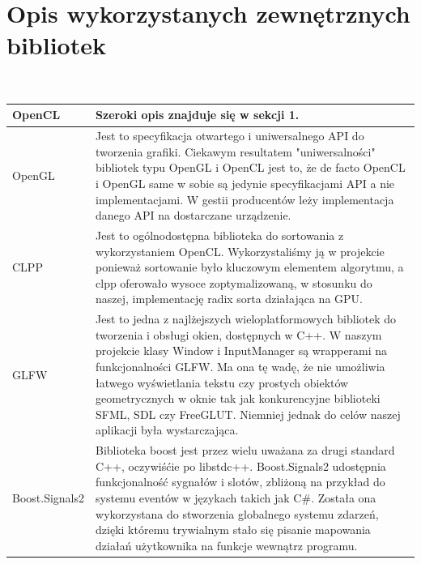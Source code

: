 \documentclass[polish, 12pt]{aghthesis}
\begin{document}
\section{Opis wykorzystanych zewnętrznych bibliotek}
	\ \\
	\begin{tabular}{| p{} | p{} |}
		\hline
			OpenCL & Szeroki opis znajduje się w sekcji 1. \\
		\hline
			OpenGL &  Jest to specyfikacja otwartego i uniwersalnego API do tworzenia grafiki. Ciekawym resultatem "uniwersalności" bibliotek typu OpenGL i OpenCL jest to, że de facto OpenCL i OpenGL same w sobie są jedynie specyfikacjami API a nie implementacjami. W gestii producentów leży implementacja danego API na dostarczane urządzenie.\\
		\hline
			CLPP &  Jest to ogólnodostępna biblioteka do sortowania z wykorzystaniem OpenCL. Wykorzystaliśmy ją w projekcie ponieważ sortowanie było kluczowym elementem algorytmu, a clpp oferowało wysoce zoptymalizowaną, w stosunku do naszej, implementację radix sorta działająca na GPU.\\
		\hline
			GLFW &  Jest to jedna z najlżejszych wieloplatformowych bibliotek do tworzenia i obsługi okien, dostępnych w C++. W naszym projekcie klasy Window i InputManager są wrapperami na funkcjonalności GLFW. Ma ona tę wadę, że nie umożliwia łatwego wyświetlania tekstu czy prostych obiektów geometrycznych w oknie tak jak konkurencyjne biblioteki SFML, SDL czy FreeGLUT. Niemniej jednak do celów naszej aplikacji była wystarczająca. \\
		\hline
			Boost.Signals2 &  Biblioteka boost jest przez wielu uważana za drugi standard C++, oczywiśćie po libstdc++. Boost.Signals2 udostępnia funkcjonalność sygnałów i slotów, zbliżoną na przykład do systemu eventów w językach takich jak C\#. Została ona wykorzystana do stworzenia globalnego systemu zdarzeń, dzięki któremu trywialnym stało się pisanie mapowania działań użytkownika na funkcje wewnątrz programu. \\
		\hline	
	\end{tabular}
	\clearpage
	
	\nocite{OpenCLProgrammingGuide,GameCodingComplete,CLPP,SPHWebinar}
	
	
\end{document}
